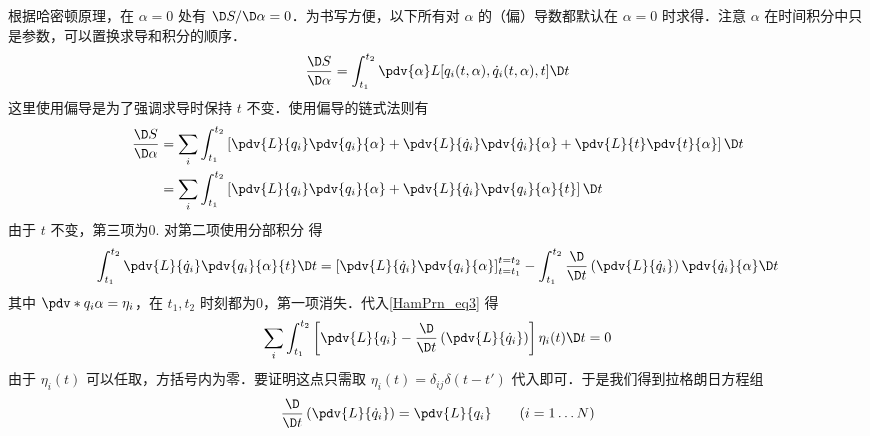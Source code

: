 根据哈密顿原理，在 $\alpha = 0$ 处有 $\D S/\D\alpha  = 0$．为书写方便，以下所有对 $\alpha$ 的（偏）导数都默认在 $\alpha=0$ 时求得．注意 $\alpha$ 在时间积分中只是参数，可以置换求导和积分的顺序．
\begin{equation}
\frac{{\D S}}{{\D\alpha }} = \int_{{t_1}}^{{t_2}} {\pdv{\alpha} L[{q_i}(t,\alpha ),{{\dot q}_i}(t,\alpha ),t]\D t}
\end{equation}
这里使用偏导是为了强调求导时保持 $t$ 不变．使用偏导的链式法则有
\begin{equation}\label{HamPrn_eq3}
\begin{aligned}
\frac{{\D S}}{{\D\alpha }} &= \sum\limits_i {\int_{{t_1}}^{{t_2}} {\left[ {\pdv{L}{q_i} \pdv{q_i}{\alpha} + \pdv{L}{\dot q_i} \pdv{\dot q_i}{\alpha} + \pdv{L}{t} \pdv{t}{\alpha}} \right]\D t} } \\
&= \sum\limits_i {\int_{{t_1}}^{{t_2}} {\left[ {\pdv{L}{q_i} \pdv{q_i}{\alpha} + \pdv{L}{\dot q_i}\pdv{q_i}{\alpha}{t}} \right]\D t} } 
\end{aligned}\end{equation}
由于 $t$ 不变，第三项为0. 对第二项使用分部积分 得
\begin{equation}
\int_{{t_1}}^{{t_2}} {\pdv{L}{\dot q_i} \pdv{q_i}{\alpha}{t} \D t}  = \left[ {\pdv{L}{\dot q_i}\pdv{q_i}{\alpha}} \right]_{t = {t_1}}^{t = {t_2}} - \int_{{t_1}}^{{t_2}} {\frac{\D}{{\D t}}\left( {\pdv{L}{\dot q_i}} \right)\pdv{\dot q_i}{\alpha} \D t} 
\end{equation}
其中 $\pdv*{q_i}{\alpha}  = {\eta _i}$，在 $t_1,t_2$ 时刻都为0，第一项消失．代入\autoref{HamPrn_eq3} 得
\begin{equation}
\sum\limits_i {\int_{{t_1}}^{{t_2}} {\left[ {\pdv{L}{q_i} - \frac{\D}{{\D t}}\left( {\pdv{L}{\dot q_i}} \right)} \right]{\eta _i}(t)\D t} }  = 0
\end{equation}
由于 ${\eta _i}(t)$ 可以任取，方括号内为零．要证明这点只需取 ${\eta _i}(t) = {\delta _{ij}}\delta (t - t')$ 代入即可．于是我们得到拉格朗日方程组
\begin{equation}
\frac{\D}{{\D t}}\left( {\pdv{L}{\dot q_i}} \right) = \pdv{L}{q_i}
\qquad
(i = 1\dots N)
\end{equation}
